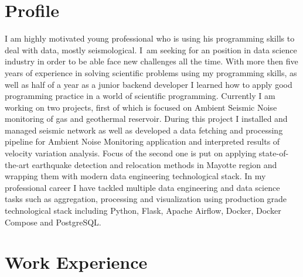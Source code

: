 \documentclass[10pt,a4paper,sans]{moderncv}
\begin{document}
\makecvtitle
\vspace{-1.5cm}

\section{Profile}
	I am highly motivated young professional who is using his programming skills to deal with data, mostly seismological.
	I~am seeking for an position in data science industry in order to be able face new challenges all the time.
	With more then five years of experience in solving scientific problems using my programming skills, as well as half of a year as a junior backend developer I learned how to apply good programming practice in a world of scientific programming.
	Currently I am working on two projects, first of which is focused on Ambient Seismic Noise monitoring of gas and geothermal reservoir.
	During this project I installed and managed seismic network as well as developed a data fetching and processing pipeline for Ambient Noise Monitoring application and interpreted results of velocity variation analysis.
	Focus of the second one is put on applying state-of-the-art earthquake detection and relocation methods in Mayotte region and wrapping them with modern data engineering technological stack.
	In my professional career I have tackled multiple data engineering and data science tasks such as aggregation, processing and visualization using production grade technological stack including Python, Flask, Apache Airflow, Docker, Docker Compose and PostgreSQL.

	\vspace{-0.20cm}
\section{Work Experience}
	\vspace{-0.05cm}
	\vspace{-0.1cm}
\end{document}
